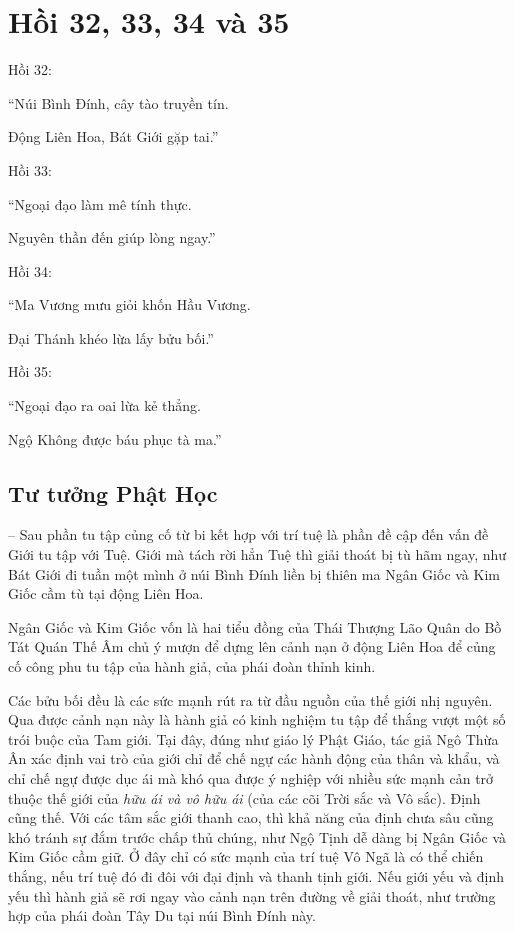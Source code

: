 \chapter{Hồi 32, 33, 34 và 35} %
\label{cha:hoi_33_34}

Hồi 32:

\begin{itshape}
``Núi Bình Đính, cây tào truyền tín.

Động Liên Hoa, Bát Giới gặp tai.''
\end{itshape}

Hồi 33:

\begin{itshape}
``Ngoại đạo làm mê tính thực.

Nguyên thần đến giúp lòng ngay.''
\end{itshape}

Hồi 34:

\begin{itshape}
``Ma Vương mưu giỏi khốn Hầu Vương.

Đại Thánh khéo lừa lấy bửu bối.''
\end{itshape}

Hồi 35:

\begin{itshape}
``Ngoại đạo ra oai lừa kẻ thẳng.

Ngộ Không được báu phục tà ma.''
\end{itshape}

\section{Tư tưởng Phật Học} %
\label{sec:33_34_phat_hoc}

-- Sau phần tu tập củng cố từ bi kết hợp với trí tuệ là phần đề cập đến vấn đề Giới tu tập với Tuệ. Giới mà tách rời hẳn Tuệ thì giải thoát bị tù hãm ngay, như Bát Giới đi tuần một mình ở núi Bình Đính liền bị thiên ma Ngân Giốc và Kim Giốc cầm tù tại động Liên Hoa.

Ngân Giốc và Kim Giốc vốn là hai tiểu đồng của Thái Thượng Lão Quân do Bồ Tát Quán Thế Âm chủ ý mượn để dựng lên cảnh nạn ở động Liên Hoa để củng cố công phu tu tập của hành giả, của phái đoàn thỉnh kinh.

Các bửu bối đều là các sức mạnh rút ra từ đầu nguồn của thế giới nhị nguyên. Qua được cảnh nạn này là hành giả có kinh nghiệm tu tập để thắng vượt một số trói buộc của Tam giới. Tại đây, đúng như giáo lý Phật Giáo, tác giả Ngô Thừa Ân xác định vai trò của giới chỉ để chế ngự các hành động của thân và khẩu, và chỉ chế ngự được dục ái mà khó qua được ý nghiệp với nhiều sức mạnh cản trở thuộc thế giới của \emph{hữu ái và vô hữu ái} (của các cõi Trời sắc và Vô sắc). Định cũng thế. Với các tâm sắc giới thanh cao, thì khả năng của định chưa sâu cũng khó tránh sự đắm trước chấp thủ chúng, như Ngộ Tịnh dễ dàng bị Ngân Giốc và Kim Giốc cầm giữ. Ở đây chỉ có sức mạnh của trí tuệ Vô Ngã là có thể chiến thắng, nếu trí tuệ đó đi đôi với đại định và thanh tịnh giới. Nếu giới yếu và định yếu thì hành giả sẽ rơi ngay vào cảnh nạn trên đường về giải thoát, như trường hợp của phái đoàn Tây Du tại núi Bình Đính này.

